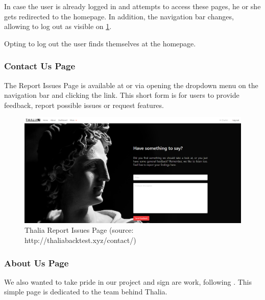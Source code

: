 \documentclass[main.tex]{subfiles}
\begin{document}
In case the user is already logged in and attempts to access these pages, he or she gets redirected to the homepage. In addition, the navigation bar changes, allowing to log out as visible on \figurename{\ref{thalia_issues}}.

Opting to log out the user finds themselves at the homepage.



\subsubsection{Contact Us Page}



The Report Issues Page is available at  or via opening the dropdown menu on the navigation bar and clicking the link. This short form is for users to provide feedback, report possible issues or request features.



\begin{figure}[H]

   \centering

   \includegraphics[width=\textwidth]{08Appendices/081User/081Pictures/issues.png}

   \caption{Thalia Report Issues Page (source: http://thaliabacktest.xyz/contact/)}

   \label{thalia_issues}

\end{figure}



\subsubsection{About Us Page}

We also wanted to take pride in our project and sign are work, following \cite{pragmaticprog}. This simple page is dedicated to the team behind Thalia.
\end{document}
